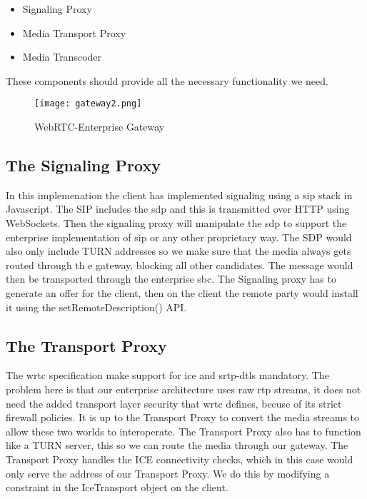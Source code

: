 \begin{itemize}
\item{Signaling Proxy}
\item{Media Transport Proxy}
\item{Media Transcoder}
\end{itemize}

These components should provide all the necessary functionality we need.
\\
\begin{figure}[here]
\centerline{\texttt{[image: gateway2.png]}}
\caption{WebRTC-Enterprise Gateway}
\label{fig:wrtc-enterprise-gateway}
\end{figure}

\subsection{The Signaling Proxy}
In this implemenation the client has implemented signaling using a \gls{sip} stack in Javascript. The SIP includes the \gls{sdp} and this is transmitted over HTTP using WebSockets. Then the signaling proxy will manipulate the \gls{sdp} to support the enterprise implementation of \gls{sip} or any other proprietary way. The SDP would also only include TURN addresses so we make sure that the media always gets routed through th e gateway, blocking all other candidates. The message would then be transported through the enterprise \gls{sbc}. The Signaling proxy has to generate an offer for the client, then on the client the remote party would install it using the setRemoteDescription() API.

\subsection{The Transport Proxy}
The \gls{wrtc} specification make support for \gls{ice} and \gls{srtp}-{dtls} mandatory. The problem here is that our enterprise architecture uses raw \gls{rtp} streams, it does not need the added transport layer security that \gls{wrtc} defines, becuse of its strict firewall policies. It is up to the Transport Proxy to convert the media streams to allow these two worlds to interoperate. The Transport Proxy also has to function like a TURN server, this so we can route the media through our gateway. The Transport Proxy handles the ICE connectivity checks, which in this case would only serve the address of our Transport Proxy. We do this by modifying a constraint in the IceTransport object on the client.

